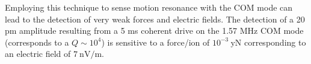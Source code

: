 \documentclass[aps,prl,superscriptaddress,floatfix]{revtex4-1}
\begin{document}
Employing this technique to sense motion resonance with the COM mode
can lead to the detection of very weak forces and electric fields.
The detection of a 20 pm amplitude resulting from a 5 ms coherent
drive on the 1.57 MHz COM mode (corresponds to a $Q\sim10^{4}$) is
sensitive to a force/ion of $10^{-3}\:\mathrm{yN}$ corresponding
to an electric field of $7\:\mathrm{nV/m}$.
\end{document}
